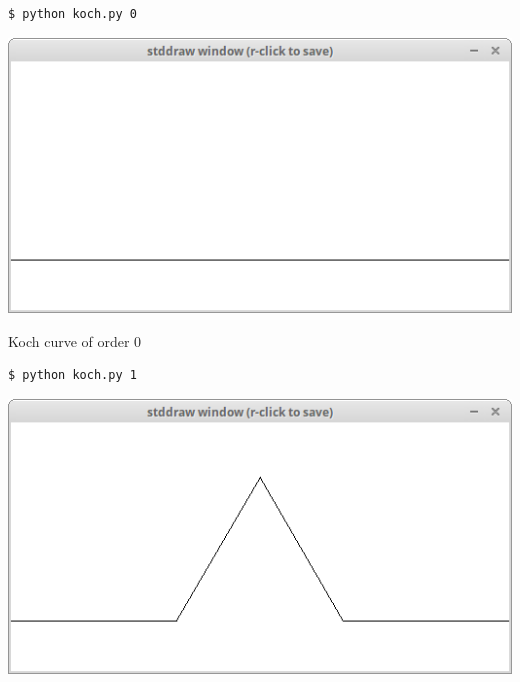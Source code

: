 \documentclass[8pt,a4paper,compress,handout]{beamer}
\begin{document}
\begin{frame}[fragile]
\begin{minipage}{200pt}
\begin{lstlisting}[language={}]
$ python koch.py 0
\end{lstlisting}
\end{minipage}%
\hfill
\begin{minipage}{100pt}
\begin{center}
\includegraphics[scale=0.12]{figures/koch1.png}

\smallskip

\tiny Koch curve of order 0
\end{center}
\end{minipage}%

\bigskip

\begin{minipage}{200pt}
\begin{lstlisting}[language={}]
$ python koch.py 1
\end{lstlisting}
\end{minipage}%
\hfill
\begin{minipage}{100pt}
\begin{center}
\includegraphics[scale=0.12]{figures/koch2.png}


\end{center}
\end{minipage}
\end{frame}
\end{document}
